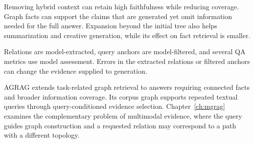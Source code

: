 \begin{samepage}
Removing hybrid context can retain high faithfulness while reducing coverage. Graph facts can support the claims that are generated yet omit information needed for the full answer. Expansion beyond the initial tree also helps summarization and creative generation, while its effect on fact retrieval is smaller.\par
\end{samepage}

Relations are model-extracted, query anchors are model-filtered, and several QA metrics use model assessment. Errors in the extracted relations or filtered anchors can change the evidence supplied to generation.

AGRAG extends task-related graph retrieval to answers requiring connected facts and broader information coverage. Its corpus graph supports repeated textual queries through query-conditioned evidence selection. Chapter~\ref{ch:mgrag} examines the complementary problem of multimodal evidence, where the query guides graph construction and a requested relation may correspond to a path with a different topology.
